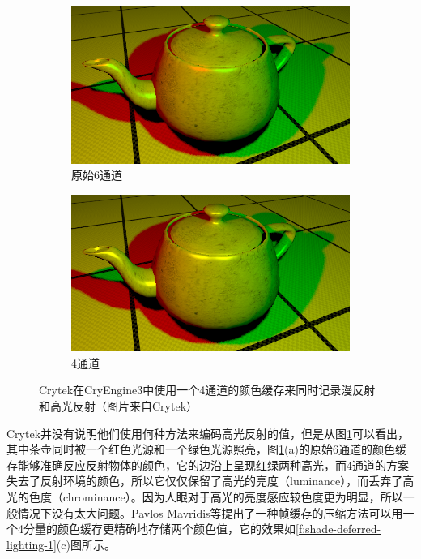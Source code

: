 \begin{figure}
	\begin{subfigure}[b]{0.49\textwidth}
		\includegraphics[width=1.\textwidth]{figures/shade/tea0}
		\caption{原始6通道}
	\end{subfigure}
	\begin{subfigure}[b]{0.49\textwidth}
		\includegraphics[width=1.\textwidth]{figures/shade/tea1}
		\caption{4通道}
	\end{subfigure}
\caption{Crytek在CryEngine3中使用一个4通道的颜色缓存来同时记录漫反射和高光反射（图片来自Crytek）}
\label{f:shade-deferred-lighting-crytek}
\end{figure}

Crytek并没有说明他们使用何种方法来编码高光反射的值，但是从图\ref{f:shade-deferred-lighting-crytek}可以看出，其中茶壶同时被一个红色光源和一个绿色光源照亮，图\ref{f:shade-deferred-lighting-crytek}(a)的原始6通道的颜色缓存能够准确反应反射物体的颜色，它的边沿上呈现红绿两种高光，而4通道的方案失去了反射环境的颜色，所以它仅仅保留了高光的亮度（luminance），而丢弃了高光的色度（chrominance）。因为人眼对于高光的亮度感应较色度更为明显，所以一般情况下没有太大问题。Pavlos Mavridis等\cite{a:TheCompactYCoCgFrameBuffer}提出了一种帧缓存的压缩方法可以用一个4分量的颜色缓存更精确地存储两个颜色值，它的效果如\ref{f:shade-deferred-lighting-1}(c)图所示。


